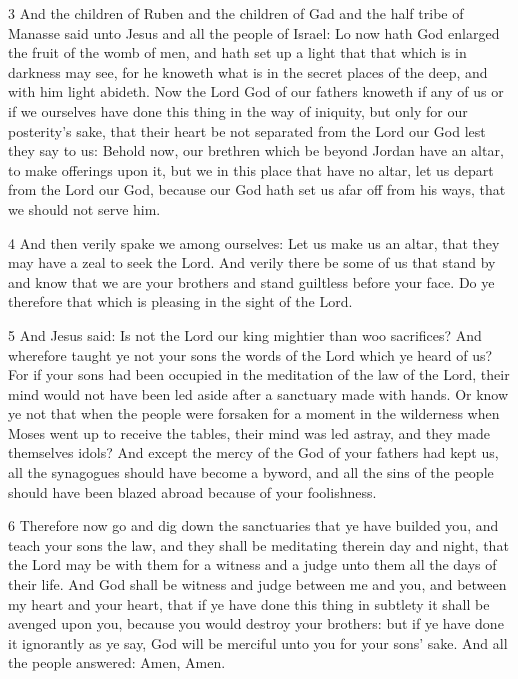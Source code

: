 \par 3 And the children of Ruben and the children of Gad and the half tribe of Manasse said unto Jesus and all the people of Israel: Lo now hath God enlarged the fruit of the womb of men, and hath set up a light that that which is in darkness may see, for he knoweth what is in the secret places of the deep, and with him light abideth. Now the Lord God of our fathers knoweth if any of us or if we ourselves have done this thing in the way of iniquity, but only for our posterity's sake, that their heart be not separated from the Lord our God lest they say to us: Behold now, our brethren which be beyond Jordan have an altar, to make offerings upon it, but we in this place that have no altar, let us depart from the Lord our God, because our God hath set us afar off from his ways, that we should not serve him. 

\par 4 And then verily spake we among ourselves: Let us make us an altar, that they may have a zeal to seek the Lord. And verily there be some of us that stand by and know that we are your brothers and stand guiltless before your face. Do ye therefore that which is pleasing in the sight of the Lord. 

\par 5 And Jesus said: Is not the Lord our king mightier than woo sacrifices? And wherefore taught ye not your sons the words of the Lord which ye heard of us? For if your sons had been occupied in the meditation of the law of the Lord, their mind would not have been led aside after a sanctuary made with hands. Or know ye not that when the people were forsaken for a moment in the wilderness when Moses went up to receive the tables, their mind was led astray, and they made themselves idols? And except the mercy of the God of your fathers had kept us, all the synagogues should have become a byword, and all the sins of the people should have been blazed abroad because of your foolishness. 

\par 6 Therefore now go and dig down the sanctuaries that ye have builded you, and teach your sons the law, and they shall be meditating therein day and night, that the Lord may be with them for a witness and a judge unto them all the days of their life. And God shall be witness and judge between me and you, and between my heart and your heart, that if ye have done this thing in subtlety it shall be avenged upon you, because you would destroy your brothers: but if ye have done it ignorantly as ye say, God will be merciful unto you for your sons' sake. And all the people answered: Amen, Amen.


